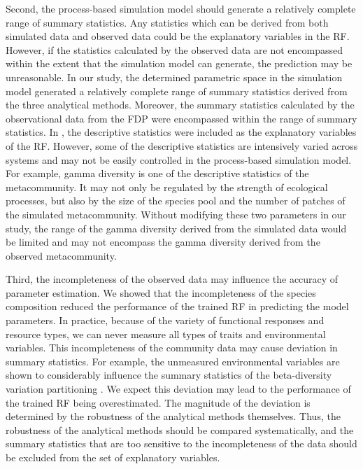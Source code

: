 Second, the process-based simulation model should generate a relatively complete range of summary statistics. Any statistics which can be derived from both simulated data and observed data could be the explanatory variables in the RF. However, if the statistics calculated by the observed data are not encompassed within the extent that the simulation model can generate, the prediction may be unreasonable. In our study, the determined parametric space in the simulation model generated a relatively complete range of summary statistics derived from the three analytical methods. Moreover, the summary statistics calculated by the observational data from the FDP were encompassed within the range of summary statistics. In \citet{guzman2022accounting}, the descriptive statistics were included as the explanatory variables of the RF. However, some of the descriptive statistics are intensively varied across systems and may not be easily controlled in the process-based simulation model. For example, gamma diversity is one of the descriptive statistics of the metacommunity. It may not only be regulated by the strength of ecological processes, but also by the size of the species pool and the number of patches of the simulated metacommunity. Without modifying these two parameters in our study, the range of the gamma diversity derived from the simulated data would be limited and may not encompass the gamma diversity derived from the observed metacommunity. 

Third, the incompleteness of the observed data may influence the accuracy of parameter estimation. We showed that the incompleteness of the species composition reduced the performance of the trained RF in predicting the model parameters. In practice, because of the variety of functional responses and resource types, we can never measure all types of traits and environmental variables. This incompleteness of the community data may cause deviation in summary statistics. For example, the unmeasured environmental variables are shown to considerably influence the summary statistics of the beta-diversity variation partitioning \citep{chang2013better}. We expect this deviation may lead to the performance of the trained RF being overestimated. The magnitude of the deviation is determined by the robustness of the analytical methods themselves. Thus, the robustness of the analytical methods should be compared systematically, and the summary statistics that are too sensitive to the incompleteness of the data should be excluded from the set of explanatory variables.

